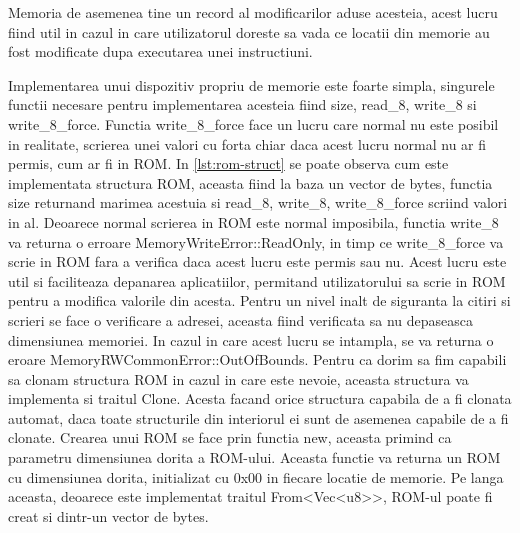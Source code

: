 \documentclass[titlepage,12pt]{article}
\DeclareRobustCommand{\code}[1]{{\ttfamily\small #1}}
\begin{document}
Memoria de asemenea tine un record al modificarilor aduse acesteia, acest lucru fiind util in cazul in care utilizatorul doreste sa vada ce locatii din memorie au fost modificate dupa executarea unei instructiuni.

Implementarea unui dispozitiv propriu de memorie este foarte simpla, singurele functii necesare pentru implementarea acesteia fiind \code{size}, \code{read\_8}, \code{write\_8} si \code{write\_8\_force}. Functia \code{write\_8\_force} face un lucru care normal nu este posibil in realitate, scrierea unei valori cu forta chiar daca acest lucru normal nu ar fi permis, cum ar fi in \code{ROM}.
In \ref{lst:rom-struct} se poate observa cum este implementata structura \code{ROM}, aceasta fiind la baza un vector de bytes, functia \code{size} returnand marimea acestuia si \code{read\_8}, \code{write\_8}, \code{write\_8\_force} scriind valori in al. Deoarece normal scrierea in \code{ROM} este normal imposibila, functia \code{write\_8} va returna o erroare \code{MemoryWriteError::ReadOnly}, in timp ce \code{write\_8\_force} va scrie in ROM fara a verifica daca acest lucru este permis sau nu. Acest lucru este util si faciliteaza depanarea aplicatiilor, permitand utilizatorului sa scrie in \code{ROM} pentru a modifica valorile din acesta.
Pentru un nivel inalt de siguranta la citiri si scrieri se face o verificare a adresei, aceasta fiind verificata sa nu depaseasca dimensiunea memoriei. In cazul in care acest lucru se intampla, se va returna o eroare \code{MemoryRWCommonError::OutOfBounds}.
Pentru ca dorim sa fim capabili sa clonam structura \code{ROM} in cazul in care este nevoie, aceasta structura va implementa si traitul \code{Clone}. Acesta facand orice structura capabila de a fi clonata automat, daca toate structurile din interiorul ei sunt de asemenea capabile de a fi clonate.
Crearea unui \code{ROM} se face prin functia \code{new}, aceasta primind ca parametru dimensiunea dorita a \code{ROM}-ului. Aceasta functie va returna un \code{ROM} cu dimensiunea dorita, initializat cu 0x00 in fiecare locatie de memorie. Pe langa aceasta, deoarece este implementat traitul \code{From<Vec<u8>>}, \code{ROM}-ul poate fi creat si dintr-un vector de bytes.
\end{document}
